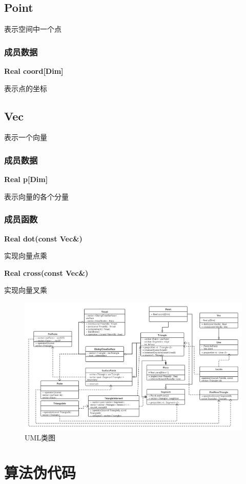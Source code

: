 \documentclass[a4paper]{book}
\numberwithin{equation}{chapter}
\theoremstyle{definition}
\begin{document}
\section{Point}
表示空间中一个点


\subsection{成员数据}
\textbf{Real coord[Dim]}

表示点的坐标


\section{Vec}
表示一个向量


\subsection{成员数据}
\textbf{Real p[Dim]}

表示向量的各个分量



\subsection{成员函数}
\textbf{Real dot(const Vec\&) }

实现向量点乘

\textbf{Real cross(const Vec\&) }

实现向量叉乘	
\begin{figure}
	\caption{UML类图}
	\includegraphics[width = 18cm]{Boolean3D.png}
\end{figure}


\chapter{算法伪代码}
\end{document}
